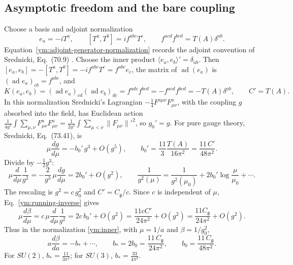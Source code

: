 \subsection{Asymptotic freedom and the bare coupling}
Choose a basis and adjoint normalization
\begin{equation}\label{ym:adjoint-generator-normalization}
 e_a=-iT^a,\qquad [T^a,T^b]=if^{abc}T^c,\qquad
 f^{acd}f^{bcd}=T(A)\delta^{ab}.
\end{equation}
Equation~\eqref{ym:adjoint-generator-normalization} records the adjoint
convention of Srednicki, Eq.~(70.9) \cite{MSrednicki2007}. Choose the inner product
$\langle e_a,e_b\rangle'=\delta_{ab}$. Then $[e_a,e_b]=-[T^a,T^b]
=-if^{abc}T^c=f^{abc}e_c$, the matrix of $\operatorname{ad}(e_a)$ is
$(\operatorname{ad}e_a)_{cb}=f^{abc}$, and
\begin{equation}\label{ym:killing-structure}
 K(e_a,e_b)=(\operatorname{ad}e_a)_{cd}(\operatorname{ad}e_b)_{dc}
 =f^{adc}f^{bcd}=-f^{acd}f^{bcd}=-T(A)\delta^{ab},\qquad C'=T(A).
\end{equation}
In this normalization Srednicki's Lagrangian
$-\frac14F^{a\mu\nu}F^a_{\mu\nu}$, with the coupling $g$ absorbed into the
field, has Euclidean action
$\frac{1}{4g^2}\int\sum_{\mu,\nu}F^a_{\mu\nu}F^a_{\mu\nu}
=\frac{1}{2g^2}\int\sum_{\mu<\nu}\|F_{\mu\nu}\|'^2$, so $g_0'=g$.
For pure gauge theory, Srednicki, Eq.~(73.41), is
\begin{equation}\label{ym:beta-function}
 \mu\frac{dg}{d\mu}=-b_0'\,g^3+O(g^5),\qquad
 b_0'=\frac{11}{3}\frac{T(A)}{16\pi^2}=\frac{11\,C'}{48\pi^2}.
\end{equation}
Divide by $-\frac12g^3$:
\begin{equation}\label{ym:running-inverse}
 \mu\frac{d}{d\mu}\frac{1}{g^2}=-\frac{2}{g^3}\,\mu\frac{dg}{d\mu}
 =2b_0'+O(g^2),\qquad
 \frac{1}{g^2(\mu)}=\frac{1}{g^2(\mu_0)}+2b_0'\log\frac{\mu}{\mu_0}
 +\cdots .
\end{equation}
The rescaling is $g^2=c\,g_0^2$ and $C'=C_{\mathfrak g}/c$.
Since $c$ is independent of $\mu$, Eq.~\eqref{ym:running-inverse} gives
\begin{equation}\label{ym:running-normalization}
 \mu\frac{d\beta}{d\mu}
 =c\,\mu\frac{d}{d\mu}\frac1{g^2}
 =2c\,b_0'+O(g^2)
 =\frac{11cC'}{24\pi^2}+O(g^2)
 =\frac{11C_{\mathfrak g}}{24\pi^2}+O(g^2).
\end{equation}
Thus in the normalization \eqref{ym:inner}, with $\mu=1/a$ and $\beta=1/g_0^2$,
\begin{equation}\label{ym:slope}
 a\frac{d\beta}{da}=-b_*+\cdots,\qquad
 b_*=2b_0=\frac{11\,C_{\mathfrak g}}{24\pi^2},\qquad
 b_0=\frac{11\,C_{\mathfrak g}}{48\pi^2}.
\end{equation}
For $SU(2)$, $b_*=\frac{11}{3\pi^2}$; for $SU(3)$, $b_*=\frac{33}{4\pi^2}$.

